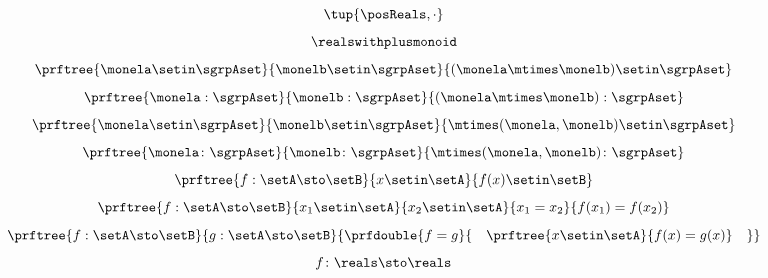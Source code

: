 {\begin{forslides}
\begin{equation}
    \end{equation}
    \begin{equation}
        \label{eq:sgrp-posreals-mult}
        \tup{\posReals, \cdot}
    \end{equation}
    \begin{equation}
        \label{eq:sgrp-reals-plus}
        \realswithplusmonoid
    \end{equation}
    \begin{equation}
        \label{eq:moncomp1}
        \prftree{\monela \setin \sgrpAset}{\monelb \setin \sgrpAset}{(\monela \mtimes \monelb) \setin \sgrpAset}
    \end{equation}
    \begin{equation}
        \label{eq:moncomp2}
        \prftree{\monela : \sgrpAset}{\monelb : \sgrpAset}{(\monela \mtimes \monelb) : \sgrpAset}
    \end{equation}
    \begin{equation}
        \label{eq:moncomp3}
        \prftree{\monela \setin \sgrpAset}{\monelb \setin \sgrpAset}{\mtimes (\monela,\monelb) \setin \sgrpAset}
    \end{equation}
    \begin{equation}
        \label{eq:moncomp4}
        \prftree{\monela \colon \sgrpAset}{\monelb \colon \sgrpAset}{\mtimes (\monela,\monelb) \colon \sgrpAset}
    \end{equation}
    \begin{equation}
        \label{eq:function-axiom1}
        \prftree{f: \setA \sto \setB}{x \setin \setA}{f(x) \setin \setB}
    \end{equation}
    \begin{equation}
        \label{eq:function-axiom2}
        \prftree{f: \setA \sto \setB}{x_1 \setin \setA}{x_2 \setin \setA}{x_1 = x_2}{f(x_1) = f(x_2) }
    \end{equation}
    \begin{equation}
        \label{eq:function-axiom3}
        \prftree{f: \setA \sto \setB}{g: \setA \sto \setB }{
            \prfdouble{
                f = g
            }{
                \quad
                \prftree{x\setin\setA}{
                    f(x) = g(x)}\quad
            }}
    \end{equation}
    \begin{equation}
        \label{eq:funcnotation1}
        \begin{aligned}
            f \colon \reals & \sto  \reals \\

\end{aligned}
\end{equation}
\end{forslides}}
